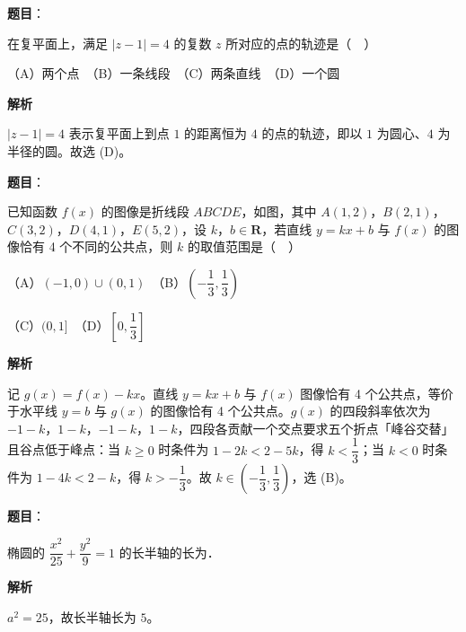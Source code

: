 \begin{answer}

\textbf{题目}：

在复平面上，满足 \(|z-1|=4\) 的复数 \(z\) 所对应的点的轨迹是（　）

（A）两个点　（B）一条线段　（C）两条直线　（D）一个圆

\textbf{解析}

\(|z-1|=4\) 表示复平面上到点 \(1\) 的距离恒为 \(4\) 的点的轨迹，即以 \(1\) 为圆心、\(4\) 为半径的圆。故选 (D)。


\end{answer}
\begin{answer}

\textbf{题目}：

已知函数 \(f(x)\) 的图像是折线段 \(ABCDE\)，如图，其中 \(A(1,2)\)，\(B(2,1)\)，\(C(3,2)\)，\(D(4,1)\)，\(E(5,2)\)，设 \(k\)，\(b\in\mathbf{R}\)，若直线 \(y=kx+b\) 与 \(f(x)\) 的图像恰有 4 个不同的公共点，则 \(k\) 的取值范围是（　）
\nopagebreak[4]
\begin{center}\end{center}
\nopagebreak[4]
（A）\((-1,0)\cup(0,1)\)　（B）\(\left(-\dfrac{1}{3},\dfrac{1}{3}\right)\)

（C）\((0,1]\)　（D）\(\left[0,\dfrac{1}{3}\right]\)

\textbf{解析}

记 \(g(x)=f(x)-kx\)。直线 \(y=kx+b\) 与 \(f(x)\) 图像恰有 4 个公共点，等价于水平线 \(y=b\) 与 \(g(x)\) 的图像恰有 4 个公共点。\(g(x)\) 的四段斜率依次为 \(-1-k\)，\(1-k\)，\(-1-k\)，\(1-k\)，四段各贡献一个交点要求五个折点「峰谷交替」且谷点低于峰点：当 \(k\geqslant 0\) 时条件为 \(1-2k<2-5k\)，得 \(k<\dfrac{1}{3}\)；当 \(k<0\) 时条件为 \(1-4k<2-k\)，得 \(k>-\dfrac{1}{3}\)。故 \(k\in\left(-\dfrac{1}{3},\dfrac{1}{3}\right)\)，选 (B)。


\end{answer}
\begin{answer}

\textbf{题目}：

椭圆的 \(\dfrac{x^{2}}{25}+\dfrac{y^{2}}{9}=1\) 的长半轴的长为\gkblank{}．

\textbf{解析}

\(a^{2}=25\)，故长半轴长为 \(5\)。


\end{answer}
